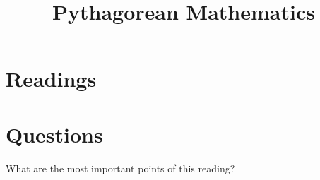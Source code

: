 \documentclass{ximera}
\title{Pythagorean Mathematics}
\begin{document}
\begin{abstract}
\end{abstract}
\maketitle






\section{Readings}








\section{Questions}




\begin{question}
What are the most important points of this reading?
\begin{freeResponse}
\end{freeResponse}
\end{question}
\end{document}
